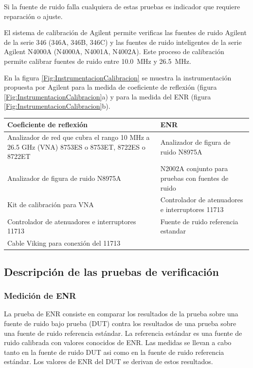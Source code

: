 Si la fuente de ruido falla cualquiera de estas pruebas es indicador que requiere reparación o ajuste.

El sistema de calibración de Agilent permite verificas las fuentes de ruido Agilent de la serie 346 (346A, 346B, 346C) y las fuentes de ruido inteligentes de la serie Agilent N4000A (N4000A, N4001A, N4002A). Este proceso de calibración permite calibrar fuentes de ruido entre \SI{10.0}{\mega\hertz} y \SI{26.5}{\mega\hertz}. 

En la figura \ref{Fig:InstrumentacionCalibracion} se muestra la instrumentación propuesta por Agilent \cite{AGI03} para la medida de coeficiente de reflexión (figura \ref{Fig:InstrumentacionCalibracion}a) y para la medida del ENR (figura \ref{Fig:InstrumentacionCalibracion}b).	

\begin{table}
	\centering
	\begin{tabular}{m{6cm}m{6cm}}
		\toprule
		\textbf{Coeficiente de reflexión} 	&	\textbf{ENR}	\\
		\midrule
		Analizador de red que cubra el rango 10 \si{\mega\hertz} a 26.5 \si{\giga\hertz} (VNA) 8753ES o 8753ET, 8722ES o 8722ET 	&	Analizador de figura de ruido N8975A \\
		\midrule
		Analizador de figura de ruido N8975A	&	N2002A conjunto para pruebas con fuentes de ruido \\
		\midrule		
		Kit de calibración para VNA			&	Controlador de atenuadores e interruptores 11713 \\
		\midrule		
		Controlador de atenuadores e interruptores 11713	& 	Fuente de ruido referencia estandar \\
		\midrule		
		Cable Viking para conexión del 11713	&	\\
		\bottomrule		
	\end{tabular}
\end{table}

\subsection{Descripción de las pruebas de verificación}
\subsubsection{Medición de ENR}
La prueba de ENR consiste en comparar los resultados de la prueba sobre una fuente de ruido bajo prueba (DUT) contra los	resultados de una prueba sobre una fuente de ruido referencia estándar. La referencia estándar es una fuente de ruido calibrada con valores conocidos de ENR. Las medidas se llevan a cabo tanto en la fuente de ruido DUT asi como en la fuente de ruido referencia estándar. Los valores de ENR del DUT se derivan de estos resultados. 

